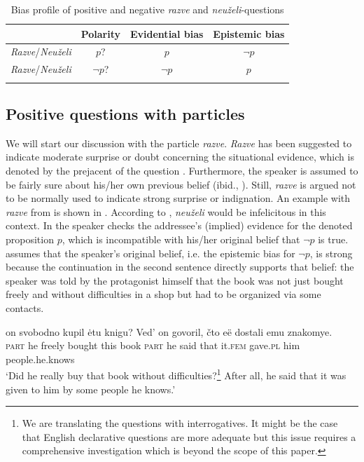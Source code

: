 \documentclass[output=paper,colorlinks,citecolor=brown]{langscibook}
\begin{document}
\begin{table}
\begin{tabularx}{0.88\textwidth}{lCCc}
\lsptoprule
& Polarity & Evidential bias & Epistemic bias \\
\midrule
\textit{Razve}/\textit{Neuželi} & $p$? & $p$ & $\neg p$ \\
\textit{Razve}/\textit{Neuželi} & $\neg p$? & $\neg p$ & $p$ \\
\lspbottomrule
\end{tabularx}
\caption{Bias profile of positive and negative \textit{razve} and \textit{neuželi}-questions} \label{tab:05:3}
\end{table}

\subsection{Positive questions with particles}\label{sec:05:3:1}

We will start our discussion with the particle \textit{razve}. \textit{Razve} has been suggested to indicate moderate surprise or doubt concerning the situational evidence, which is denoted by the prejacent of the question \citep{apresjan80, rathmayr85, baranov86, kirschbaum01, matko14}. Furthermore, the speaker is assumed to be fairly sure about his/her own previous belief (ibid., \cite{vostokow1831}). Still, \textit{razve} is argued not to be normally used to indicate strong surprise or indignation. An example with \textit{razve} from \citet[126]{baranov86} is shown in . According to \citet{baranov86}, \textit{neuželi} would be infelicitous in this context. In  the speaker checks the addressee's (implied) evidence for the denoted proposition $p$, which is incompatible with his/her original belief that $\neg p$ is true. \citet{baranov86} assumes that the speaker's original belief, i.e. the epistemic bias for $\neg p$, is strong because the continuation in the second sentence directly supports that belief: the speaker was told by the protagonist himself that the book was not just bought freely and without difficulties in a shop but had to be organized via some contacts.

\ea\label{ex:05:4}
 on svobodno kupil ėtu knigu? Ved' on govoril, čto eë dostali emu znakomye. \\
{\textsc{part}} he freely bought this book \textsc{part} he said that it.\textsc{fem} gave.\textsc{pl} him people.he.knows \\
\glt `Did he really buy that book without difficulties?\footnote[5]{We are translating the questions with interrogatives. It might be the case that English declarative questions are more adequate but this issue requires a comprehensive investigation which is beyond the scope of this paper.} After all, he said that it was given to him by some people he knows.'
\z
\end{document}
